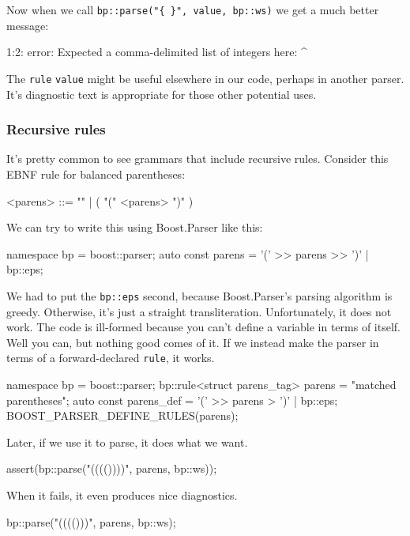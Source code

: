 Now when we call \texttt{bp::parse("\{ \}", value, bp::ws)} we get a much better message:

\begin{code}
1:2: error: Expected a comma-delimited list of integers here:
{ }
  ^
\end{code}

The \texttt{rule} \texttt{value} might be useful elsewhere in our code, perhaps in another parser. It's diagnostic text is appropriate for those other potential uses.

\subsubsection{Recursive rules}

It's pretty common to see grammars that include recursive rules. Consider this EBNF rule for balanced parentheses:

\begin{code}
<parens> ::= "" | ( "(" <parens> ")" )
\end{code}

We can try to write this using Boost.Parser like this:

\begin{code}
namespace bp = boost::parser;
auto const parens = '(' >> parens >> ')' | bp::eps;
\end{code}

We had to put the \texttt{bp::eps} second, because Boost.Parser's parsing algorithm is greedy. Otherwise, it's just a straight transliteration. Unfortunately, it does not work. The code is ill-formed because you can't define a variable in terms of itself. Well you can, but nothing good comes of it. If we instead make the parser in terms of a forward-declared \texttt{rule}, it works.

\begin{code}
namespace bp = boost::parser;
bp::rule<struct parens_tag> parens = "matched parentheses";
auto const parens_def = '(' >> parens > ')' | bp::eps;
BOOST_PARSER_DEFINE_RULES(parens);
\end{code}

Later, if we use it to parse, it does what we want.

\begin{code}
assert(bp::parse("(((())))", parens, bp::ws));
\end{code}

When it fails, it even produces nice diagnostics.

\begin{code}
bp::parse("(((()))", parens, bp::ws);
\end{code}

